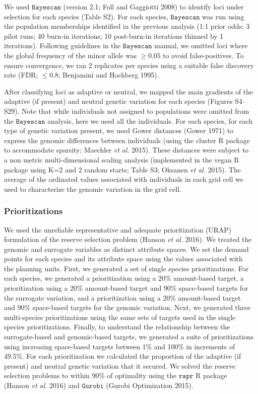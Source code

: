 \documentclass[11pt,]{article}
\begin{document}
We used $\texttt{Bayescan}$ (version 2.1; Foll and Gaggiotti 2008) to
identify loci under selection for each species (Table S2). For each
species, $\texttt{Bayescan}$ was run using the population memberships
identified in the previous analysis (1:1 prior odds; 3 pilot runs; 40
burn-in iterations; 10 post-burn-in iterations thinned by 1 iterations).
Following guidelines in the $\texttt{Bayescan}$ manual, we omitted loci
where the global frequency of the minor allele was $\geq 0.05$ to avoid
false-positives. To ensure convergence, we ran 2 replicates per species
using a suitable false discovery rate (FDR; $\leq 0.8$; Benjamini and
Hochberg 1995).

After classifying loci as adaptive or neutral, we mapped the main
gradients of the adaptive (if present) and neutral genetic variation for
each species (Figures S4--S29). Note that while individuals not assigned
to populations were omitted from the $\texttt{Bayescan}$ analysis, here
we used all the individuals. For each species, for each type of genetic
variation present, we used Gower distances (Gower 1971) to express the
genomic differences between individuals (using the cluster R package to
accommodate sparsity; Maechler \emph{et al.} 2015). These distances were
subject to a non metric multi-dimensional scaling analysis (implemented
in the vegan R package using K=2 and 2 random starts; Table S3; Oksanen
\emph{et al.} 2015). The average of the ordinated values associated with
individuals in each grid cell we used to characterize the genomic
variation in the grid cell.

\subsubsection{Prioritizations}\label{prioritizations}

We used the unreliable representative and adequate prioritization (URAP)
formulation of the reserve selection problem (Hanson \emph{et al.}
2016). We treated the genomic and surrogate variables as distinct
attribute spaces. We set the demand points for each species and its
attribute space using the values associated with the planning units.
First, we generated a set of single species prioritizations. For each
species, we generated a prioritization using a 20\% amount-based target,
a prioritization using a 20\% amount-based target and 90\% space-based
targets for the surrogate variation, and a prioritization using a 20\%
amount-based target and 90\% space-based targets for the genomic
variation. Next, we generated three multi-species prioritizations using
the same sets of targets used in the single species prioritizations.
Finally, to understand the relationship between the surrogate-based and
genomic-based targets, we generated a suite of prioritizations using
increasing space-based targets between 1\% and 100\% in increments of
49.5\%. For each prioritization we calculated the proportion of the
adaptive (if present) and neutral genetic variation that it secured. We
solved the reserve selection problems to within 90\% of optimality using
the $\texttt{rapr}$ R package (Hanson \emph{et al.} 2016) and
$\texttt{Gurobi}$ (Gurobi Optimization 2015).
\end{document}
